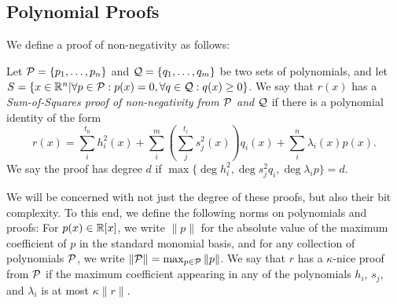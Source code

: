 \subsection{Polynomial Proofs}
We define a proof of non-negativity as follows:
\begin{definition}
Let $\mathcal P = \{p_1,\dots,p_n\}$ and $\mathcal Q = \{q_1,\dots,q_m\}$ be two sets of polynomials, and let $S = \{x \in \mathbb R^n | \forall p \in \mathcal P: p(x) = 0, \forall q \in \mathcal Q: q(x) \geq 0\}$. We say that $r(x)$ has a \emph{Sum-of-Squares proof of non-negativity from $\mathcal P$ and $\mathcal Q$} if there is a polynomial identity of the form
\[r(x) = \sum_{i}^{t_0} h_i^2(x) + \sum_{i}^m \left(\sum_{j}^{t_i} s_j^2(x)\right)q_i(x) + \sum_{i}^n \lambda_i(x) p(x).\]
We say the proof has degree $d$ if $\max \{\deg h_i^2, \deg s_j^2q_i, \deg \lambda_i p\} = d$.
\end{definition}
We will be concerned with not just the degree of these proofs, but also their bit complexity. To this end, we define the following norms on polynomials and proofs: For $p(x) \in \mathbb R[x]$, we write $\|p\|$ for the absolute value of the maximum coefficient of $p$ in the standard monomial basis, and for any collection of polynomials $\mathcal P$, we write $\|\mathcal P\| = \max_{p \in \mathcal P} \|p\|$. We say that $r$ has a $\kappa$-nice proof from $\mathcal P$ if the maximum coefficient appearing in any of the polynomials $h_i$, $s_j$, and $\lambda_i$ is at most $\kappa \|r\|$.

